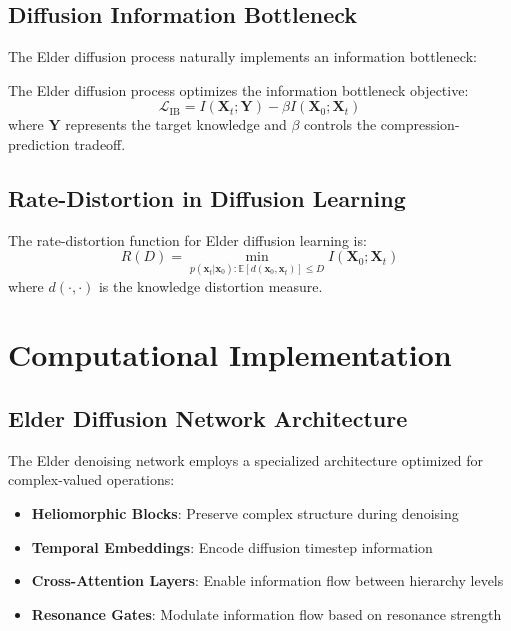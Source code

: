 \subsection{Diffusion Information Bottleneck}

The Elder diffusion process naturally implements an information bottleneck:

\begin{theorem}
The Elder diffusion process optimizes the information bottleneck objective:
\begin{equation}
\mathcal{L}_{\text{IB}} = I(\mathbf{X}_t; \mathbf{Y}) - \beta I(\mathbf{X}_0; \mathbf{X}_t)
\end{equation}
where $\mathbf{Y}$ represents the target knowledge and $\beta$ controls the compression-prediction tradeoff.
\end{theorem}

\subsection{Rate-Distortion in Diffusion Learning}

\begin{definition}
The rate-distortion function for Elder diffusion learning is:
\begin{equation}
R(D) = \min_{p(\mathbf{x}_t|\mathbf{x}_0): \mathbb{E}[d(\mathbf{x}_0, \mathbf{x}_t)] \leq D} I(\mathbf{X}_0; \mathbf{X}_t)
\end{equation}
where $d(\cdot, \cdot)$ is the knowledge distortion measure.
\end{definition}

\section{Computational Implementation}

\subsection{Elder Diffusion Network Architecture}

The Elder denoising network employs a specialized architecture optimized for complex-valued operations:

\begin{itemize}
\item \textbf{Heliomorphic Blocks}: Preserve complex structure during denoising
\item \textbf{Temporal Embeddings}: Encode diffusion timestep information
\item \textbf{Cross-Attention Layers}: Enable information flow between hierarchy levels
\item \textbf{Resonance Gates}: Modulate information flow based on resonance strength
\end{itemize}

